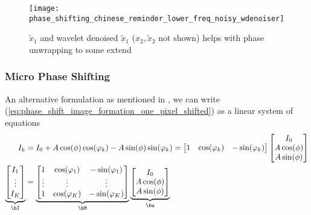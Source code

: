 \documentclass[../writeup.tex]{subfiles}
\begin{document}
\begin{figure}[h!]
    \begin{center}
        \texttt{[image: phase\_shifting\_chinese\_reminder\_lower\_freq\_noisy\_wdenoiser]}
    \end{center}
    \caption{$\tilde{x}_1$ and wavelet denoised $\tilde{x}_1$ ($x_2,\tilde{x}_2$ not shown) helps with phase unwrapping to some extend}
    \label{fig:phase_shifting_chinese_reminder_lower_freq_noisy_wdenoiser}
\end{figure}

\subsubsection{Micro Phase Shifting}
An alternative formulation as mentioned in \cite{guptaMicroPhaseShifting2012}, we can write (\ref{eq:phase_shift_image_formation_one_pixel_shifted}) as a linear system of equations
\begin{align*}
    I_k
        &= I_0 + A\cos(\phi)\cos(\varphi_k) - A\sin(\phi)\sin(\varphi_k)
        = \begin{bmatrix}
            1 & \cos(\varphi_k) & -\sin(\varphi_k)
        \end{bmatrix}
        \begin{bmatrix}
            I_0 \\ A\cos(\phi) \\ A\sin(\phi)
        \end{bmatrix} \\
    \underbrace{
        \begin{bmatrix}
            I_1 \\ \vdots \\ I_K
        \end{bmatrix}
    }_{\bI}
        &= 
        \underbrace{
            \begin{bmatrix}
                1 & \cos(\varphi_1) & -\sin(\varphi_1) \\
                \vdots & \vdots & \vdots \\
                1 & \cos(\varphi_K) & -\sin(\varphi_K) \\
            \end{bmatrix}
        }_{\bM}
        \underbrace{
            \begin{bmatrix}
                I_0 \\ A\cos(\phi) \\ A\sin(\phi)
            \end{bmatrix}
        }_{\bu}
\end{align*}
\end{document}
